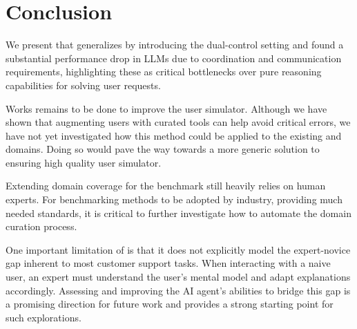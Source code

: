 \section{Conclusion}
\label{sec:conclusion}

We present \bench that generalizes \taubench by introducing the dual-control setting and found a substantial performance drop in LLMs due to coordination and communication requirements, highlighting these as critical bottlenecks over pure reasoning capabilities for solving user requests.

Works remains to be done to improve the user simulator. Although we have shown that augmenting users with curated tools can help avoid critical errors, we have not yet investigated how this method could be applied to the existing \airline and \retail domains. Doing so would pave the way towards a more generic solution to ensuring high quality user simulator. 

Extending domain coverage for the benchmark still heavily relies on human experts. For benchmarking methods to be adopted by industry, providing much needed standards, it is critical to further investigate how to automate the domain curation process.

One important limitation of \bench is that it does not explicitly model the expert-novice gap inherent to most customer support tasks. When interacting with a naive user, an expert must understand the user's mental model and adapt explanations accordingly. Assessing and improving the AI agent's abilities to bridge this gap is a promising direction for future work and \bench provides a strong starting point for such explorations.
